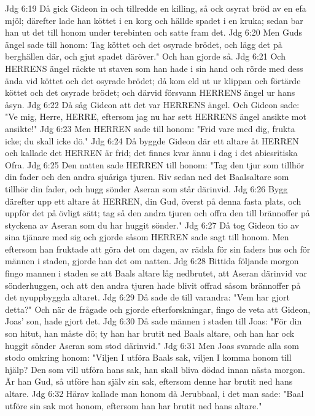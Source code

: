 Jdg 6:19  Då gick Gideon in och tillredde en killing, så ock osyrat bröd av en efa mjöl; därefter lade han köttet i en korg och hällde spadet i en kruka; sedan bar han ut det till honom under terebinten och satte fram det.
Jdg 6:20  Men Guds ängel sade till honom: Tag köttet och det osyrade brödet, och lägg det på berghällen där, och gjut spadet däröver." Och han gjorde så.
Jdg 6:21  Och HERRENS ängel räckte ut staven som han hade i sin hand och rörde med dess ända vid köttet och det osyrade brödet; då kom eld ut ur klippan och förtärde köttet och det osyrade brödet; och därvid försvann HERRENS ängel ur hans åsyn.
Jdg 6:22  Då såg Gideon att det var HERRENS ängel. Och Gideon sade: "Ve mig, Herre, HERRE, eftersom jag nu har sett HERRENS ängel ansikte mot ansikte!"
Jdg 6:23  Men HERREN sade till honom: "Frid vare med dig, frukta icke; du skall icke dö."
Jdg 6:24  Då byggde Gideon där ett altare åt HERREN och kallade det HERREN är frid; det finnes kvar ännu i dag i det abiesritiska Ofra.
Jdg 6:25  Den natten sade HERREN till honom: "Tag den tjur som tillhör din fader och den andra sjuåriga tjuren. Riv sedan ned det Baalsaltare som tillhör din fader, och hugg sönder Aseran som står därinvid.
Jdg 6:26  Bygg därefter upp ett altare åt HERREN, din Gud, överst på denna fasta plats, och uppför det på övligt sätt; tag så den andra tjuren och offra den till brännoffer på styckena av Aseran som du har huggit sönder."
Jdg 6:27  Då tog Gideon tio av sina tjänare med sig och gjorde såsom HERREN sade sagt till honom. Men eftersom han fruktade att göra det om dagen, av rädsla för sin faders hus och för männen i staden, gjorde han det om natten.
Jdg 6:28  Bittida följande morgon fingo mannen i staden se att Baals altare låg nedbrutet, att Aseran därinvid var sönderhuggen, och att den andra tjuren hade blivit offrad såsom brännoffer på det nyuppbyggda altaret.
Jdg 6:29  Då sade de till varandra: "Vem har gjort detta?" Och när de frågade och gjorde efterforskningar, fingo de veta att Gideon, Joas' son, hade gjort det.
Jdg 6:30  Då sade männen i staden till Joas: "För din son hitut, han måste dö; ty han har brutit ned Baals altare, och han har ock huggit sönder Aseran som stod därinvid."
Jdg 6:31  Men Joas svarade alla som stodo omkring honom: "Viljen I utföra Baals sak, viljen I komma honom till hjälp? Den som vill utföra hans sak, han skall bliva dödad innan nästa morgon. Är han Gud, så utföre han själv sin sak, eftersom denne har brutit ned hans altare.
Jdg 6:32  Härav kallade man honom då Jerubbaal, i det man sade: "Baal utföre sin sak mot honom, eftersom han har brutit ned hans altare."
